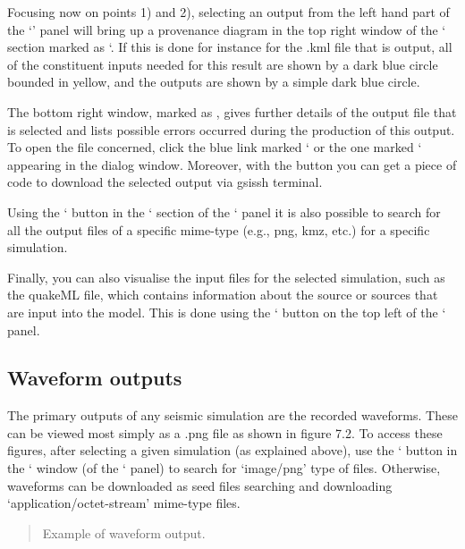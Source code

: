 \documentclass[english]{book}
\begin{document}
Focusing now on points 1) and 2), selecting an output from the left hand
part of the ‘’ panel will bring up a provenance diagram in
the top right window of the ‘ section marked as ‘. If this is done for instance for the .kml file that
is output, all of the constituent inputs needed for this result are
shown by a dark blue circle bounded in yellow, and the outputs are shown
by a simple dark blue circle.

The bottom right window, marked as , gives further
details of the output file that is selected and lists possible errors
occurred during the production of this output. To open the file
concerned, click the blue link marked ‘ or the one marked
‘ appearing in the dialog window. Moreover, with the button
 you can get a piece of code to download the
selected output via gsissh terminal.

Using the ‘ button in the ‘  section of
the ‘ panel it is also possible to search for all the output
files of a specific mime-type (e.g., png, kmz, etc.) for a specific
simulation.

Finally, you can also visualise the input files for the selected
simulation, such as the quakeML file, which contains information about
the source or sources that are input into the model. This is done using
the ‘ button on the top left of the ‘ panel.


\subsection{Waveform outputs}
\label{\detokenize{Section7:waveform-outputs}}
The primary outputs of any seismic simulation are the recorded
waveforms. These can be viewed most simply as a .png file as shown in
figure 7.2. To access these figures, after selecting a given simulation
(as explained above), use the ‘ button in the ‘
 window (of the ‘ panel) to search for
‘image/png’ type of files. Otherwise, waveforms can be downloaded as
seed files searching and downloading ‘application/octet-stream’
mime-type files.
\begin{quote}


 Example of waveform output.
\end{quote}
\end{document}

